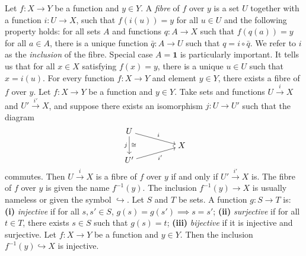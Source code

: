  Let $f \colon X \to Y$ be a function and $y \in Y$. A \textit{fibre} of $f$ over $y$ is a set $U$ together with a function $i \colon U \to X$, such that $f(i(u)) = y$ for all $u \in U$ and the following property holds: for all sets $A$ and functions $q \colon A \to X$ such that $f(q(a)) = y$ for all $a \in A$, there is a unique function $\bar{q} \colon A \to U$ such that $q = i \circ \bar{q}$. We refer to $i$ as the \textit{inclusion} of the fibre.
 Special case $A = \mathbf{1}$ is particularly important. It tells us that for all $x \in X$ satisfying $f(x) = y$, there is a unique $u \in U$ such that $x = i(u)$.
 For every function $f \colon X \to Y$ and element $y \in Y$, there exists a fibre of $f$ over $y$.
 Let $f \colon X \to Y$ be a function and $y \in Y$. Take sets and functions $U \xrightarrow{i} X$ and $U' \xrightarrow{i'} X$, and suppose there exists an isomorphism $j \colon U \to U'$ such that the diagram
\[\begin{tikzcd}[cramped,row sep=tiny]
	U \\
	&& X \\
	{U'}
	\arrow["i", from=1-1, to=2-3]
	\arrow["j"', "\cong", from=1-1, to=3-1]
	\arrow["{i'}"', from=3-1, to=2-3]
\end{tikzcd}\]
commutes. Then $U \xrightarrow{i} X$ is a fibre of $f$ over $y$ if and only if $U' \xrightarrow{i'} X$ is.
 The fibre of $f$ over $y$ is given the name $f^{-1}(y)$. The inclusion $f^{-1}(y) \to X$ is usually nameless or given the symbol $\hookrightarrow$.
 Let $S$ and $T$ be sets. A function $g \colon S \to T$ is: \textbf{(i)} \textit{injective} if for all $s, s' \in S$, $g(s) = g(s') \implies s = s'$; \textbf{(ii)} \textit{surjective} if for all $t \in T$, there exists $s \in S$ such that $g(s) = t$; \textbf{(iii)} \textit{bijective} if it is injective and surjective.
 Let $f \colon X \to Y$ be a function and $y \in Y$. Then the inclusion $f^{-1}(y) \hookrightarrow X$ is injective.